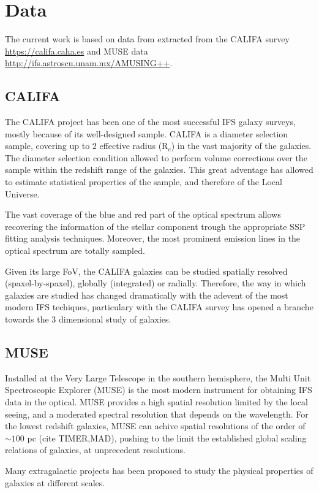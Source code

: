 \section{Data}
The current work is based on data from extracted from the CALIFA survey \url{https://califa.caha.es} and MUSE data \url{http://ifs.astroscu.unam.mx/AMUSING++}.

\subsection{CALIFA}
The CALIFA project has been one of the most successful IFS galaxy surveys, mostly because of its well-designed sample.
CALIFA is a diameter selection sample, covering up to 2 effective radius (R$_e$) in the vast majority of the galaxies. 
The diameter selection condition allowed to perform volume corrections over the sample within
the redshift range of the galaxies. This great adventage has allowed to estimate statistical properties of the sample, and therefore of the Local Universe. 

The vast coverage of the blue and red part of the optical spectrum allows recovering the information of the stellar component trough the appropriate SSP fitting analysis techniques. Moreover, the most prominent emission lines in the optical spectrum are totally sampled.

Given its large FoV, the CALIFA galaxies can be studied spatially resolved (spaxel-by-spaxel), globally (integrated) or radially. Therefore, the way in which galaxies are studied 
has changed dramatically with the adevent of the most modern IFS techiques, particulary with the CALIFA survey has opened a branche towards the 3 dimensional study of galaxies.

\subsection{MUSE}

Installed at the  Very Large Telescope in the southern hemisphere, the Multi Unit Spectroscopic Explorer (MUSE) is the most modern instrument for obtaining IFS data in the optical. MUSE
provides a high spatial resolution limited by the local seeing, and a moderated spectral resolution that depends on the wavelength. For the lowest redshift galaxies, MUSE can 
achive spatial resolutions of the order of $\sim 100$ pc (cite TIMER,MAD), pushing to the limit the established global scaling relations of galaxies, 
at unprecedent resolutions. 

Many extragalactic projects has been proposed to study the physical properties of galaxies at different scales.

